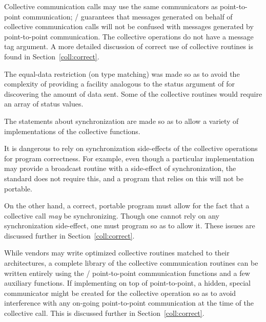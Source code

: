 Collective communication calls may use the same
communicators as point-to-point communication; \MPI/ guarantees that
messages generated on behalf of collective communication calls will not
be confused with messages generated by point-to-point communication.
The collective operations do not have a message tag argument.
A more detailed discussion of correct use of collective
routines is found in Section~\ref {coll:correct}.

\begin{rationale}
The equal-data restriction (on type matching) was made so
as to avoid the complexity
of providing a facility analogous to the status
argument of  for discovering the amount of data sent.
Some of the collective routines would require an array of status values.

The statements about synchronization are made so as to allow a variety
of implementations of the collective functions.

\end{rationale}

\begin{users}
It is dangerous to rely on synchronization
side-effects of the collective operations for program correctness.
For example, even though a particular implementation may
provide a broadcast routine
with a side-effect of synchronization, the standard does not require
this, and a program that relies on this will not be portable.

On the other hand, a correct, portable program must allow for the fact
that a collective call \emph{may} be synchronizing.  Though one cannot
rely on any synchronization side-effect, one must program so as to allow
it.  These issues are discussed further in Section~\ref{coll:correct}.
\end{users}

\begin{implementors}
\sloppy %
While vendors may write optimized collective routines matched to
their architectures, a complete library of the collective communication
routines can be written entirely using the \MPI/ point-to-point communication
functions and a few auxiliary functions.  If implementing on top of
point-to-point, a hidden, special communicator might
be created for the
collective operation so as to avoid interference with any on-going
point-to-point communication at the time of the collective call.  This
is discussed further in Section~\ref{coll:correct}.
\end{implementors}

